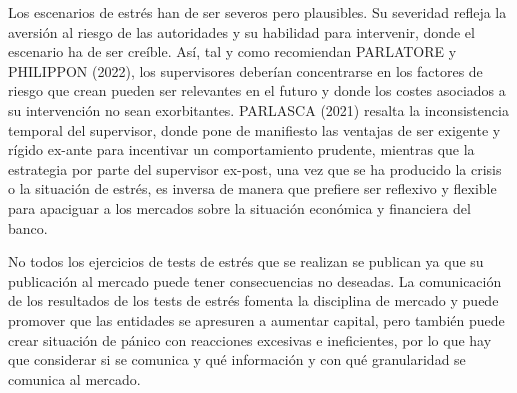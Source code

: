 \documentclass[10pt,a4paper]{article}
\begin{document}
Los escenarios de estrés han de ser severos pero plausibles. Su severidad refleja la aversión al riesgo de las autoridades y su habilidad para intervenir, donde el escenario ha de ser creíble. Así, tal y como recomiendan PARLATORE y PHILIPPON (2022), los supervisores deberían concentrarse en los factores de riesgo que crean pueden ser relevantes en el futuro y donde los costes asociados a su intervención no sean exorbitantes. PARLASCA (2021) resalta la inconsistencia temporal del supervisor, donde pone de manifiesto las ventajas de ser exigente y rígido ex-ante para incentivar un comportamiento prudente, mientras que la estrategia por parte del supervisor ex-post, una vez que se ha producido la crisis o la situación de estrés, es inversa de manera que prefiere ser reflexivo y flexible para apaciguar a los mercados sobre la situación económica y financiera del banco. 

No todos los ejercicios de tests de estrés que se realizan se publican ya que su publicación al mercado puede tener consecuencias no deseadas. La comunicación de los resultados de los tests de estrés fomenta la disciplina de mercado y puede promover que las entidades se apresuren a aumentar capital, pero también puede crear situación de pánico con reacciones excesivas e ineficientes, por lo que hay que considerar si se comunica y qué información y con qué granularidad se comunica al mercado.


\clearpage
\end{document}

